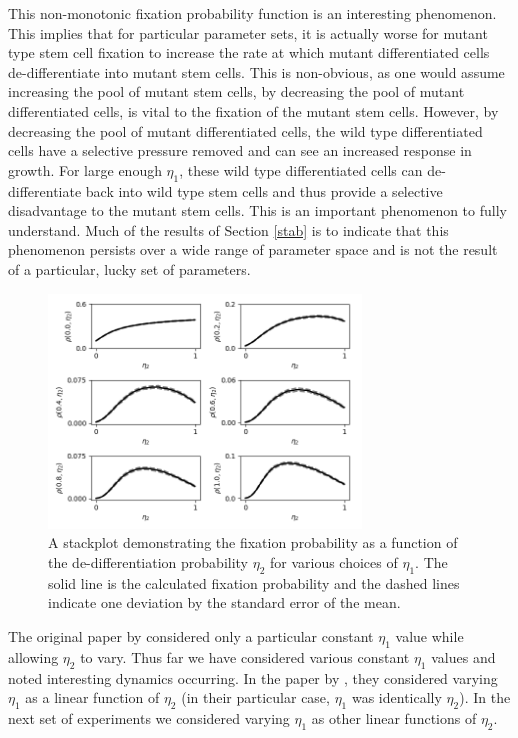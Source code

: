 \documentclass[12pt]{article}
\begin{document}
This non-monotonic fixation probability function is an interesting phenomenon. This implies that for particular parameter sets, it is actually worse for mutant type stem cell fixation to increase the rate at which mutant differentiated cells de-differentiate into mutant stem cells. This is non-obvious, as one would assume increasing the pool of mutant stem cells, by decreasing the pool of mutant differentiated cells, is vital to the fixation of the mutant stem cells. However, by decreasing the pool of mutant differentiated cells, the wild type differentiated cells have a selective pressure removed and can see an increased response in growth. For large enough $\eta_1$, these wild type differentiated cells can de-differentiate back into wild type stem cells and thus provide a selective disadvantage to the mutant stem cells. This is an important phenomenon to fully understand. Much of the results of Section \ref{stab} is to indicate that this phenomenon persists over a wide range of parameter space and is not the result of a particular, lucky set of parameters.

\begin{figure}[H]
\begin{center}
\includegraphics[width=0.74\textwidth]{constant_eta1_stackplot.png}
\end{center}
\caption{A stackplot demonstrating the fixation probability as a function of the de-differentiation probability $\eta_2$ for various choices of $\eta_1$. The solid line is the calculated fixation probability and the dashed lines indicate one deviation by the standard error of the mean.}\label{constantEta1Stack}
\end{figure}

The original paper by \cite{mohammad} considered only a particular constant $\eta_1$ value while allowing $\eta_2$ to vary. Thus far we have considered various constant $\eta_1$ values and noted interesting dynamics occurring. In the paper by \cite{wodarz}, they considered varying $\eta_1$ as a linear function of $\eta_2$ (in their particular case, $\eta_1$ was identically $\eta_2$). In the next set of experiments we considered varying $\eta_1$ as other linear functions of $\eta_2$. 
\end{document}
